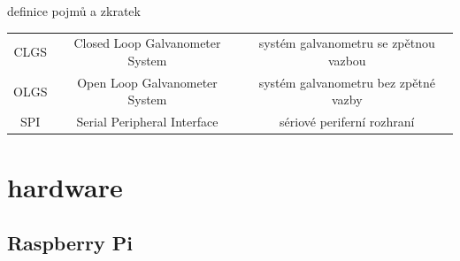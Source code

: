 \documentclass{template/socthesis}
\begin{document}
\newpage

definice pojmů a zkratek
\begin{center}
  \begin{tabular}{c c c}
    CLGS & Closed Loop Galvanometer System & systém galvanometru se zpětnou vazbou \\
    OLGS & Open Loop Galvanometer System & systém galvanometru bez zpětné vazby \\
    SPI & Serial Peripheral Interface & sériové periferní rozhraní \\
  \end{tabular}
\end{center}

\chapter{hardware}

\section{Raspberry Pi}
\end{document}
